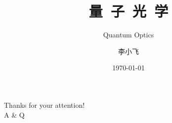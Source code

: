 \documentclass[12pt,UTF8,aspectratio=169]{beamer}
\begin{document}

\author{李小飞}
\title{\textbf{\Huge 量~子~光~学}}
\subtitle{Quantum Optics}
\date{\today}

\begin{frame} [plain]
     {} %
    \Background[17] 
    \maketitle
    \addtocounter{framenumber}{-1} 
\end{frame}

%

%


\begin{frame}[plain]
    \Background[2] 
	\begin{center}
		{\huge \color{deepred} \textrm{Thanks for your attention!  \\ \vspace{1.0em}
         A \& Q}}
	\end{center}
    \addtocounter{framenumber}{-1} 
\end{frame}

\end{document}
